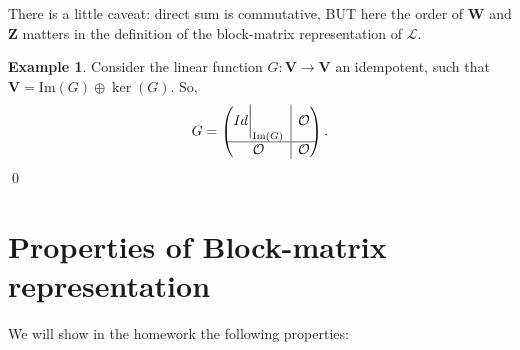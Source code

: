 \documentclass{book}
\theoremstyle{definition}
\newtheorem{exmp}{Example}[section]
\newcommand{\V}{\mathbf{V}}
\newcommand{\W}{\mathbf{W}}
\newcommand{\Z}{\mathbf{Z}}
\newcommand{\lag}{\mathcal{L}}
\newcommand{\ima}{\text{Im}}
\newcommand{\rvline}{\hspace*{-\arraycolsep}\vline\hspace*{-\arraycolsep}}
\begin{document}
There is a little caveat: direct sum is commutative, BUT here the order of $\W$ and $\Z$ matters in the definition of the block-matrix representation of $\lag$. 

\begin{exmp}
	Consider the linear function $G : \V \to \V$ an idempotent, such that $\V = \ima(G) \oplus \ker(G)$. So,
	\begin{align*}
	G = \begin{pmatrix}
	Id \bigg\vert_{\ima(G)} & \rvline & \mathcal{O}\\
	\hline
	\mathcal{O} & \rvline & \mathcal{O}
	\end{pmatrix}.
	\end{align*}\qed
\end{exmp}







\section{Properties of Block-matrix representation}
We will show in the homework the following properties:
\end{document}
